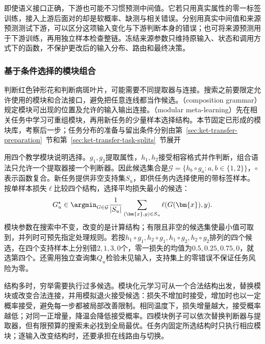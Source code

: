 即使语义接口正确，下游也可能不习惯预测中间值。它若只用真实属性的零一标签训练，接入上游后面对的却是软概率、缺测与相关错误。分别用真实中间值和来源预测测试下游，可以区分这项输入变化与下游判断本身的错误；也可将来源预测用于下游训练，再用独立样本检查整链。冻结来源参数只维持原输入、状态和调用方式下的函数，不保护更改后的输入分布、路由和最终决策。

\subsubsection{基于条件选择的模块组合}
\label{sec:ket-integration-conditional-modules}

判断红色钟形花和判断病斑叶片，可能需要不同提取器与连接。搜索之前要限定允许使用的模块和合法接口，避免把任意连线都当作候选。（composition grammar）规定模块可出现的位置及允许的输入输出连接。（modular meta-learning）先在相关任务中学习可重组模块，再用新任务的少量样本选择结构。本节固定已形成的模块库，考察后一步；任务分布的准备与留出条件分别由第~\ref{sec:ket-transfer-preparation}~节和第~\ref{sec:ket-transfer-task-splits}~节展开

用四个教学模块说明选择。$g_1,g_2$提取属性，$h_1,h_2$接受相容格式并作判断，组合语法只允许一个提取器接一个判断器。因此候选集合是$\mathcal{G}=\{h_b\circ g_a:a,b\in\{1,2\}\}$，$\circ$表示函数复合。新任务提供非空支持集$S_u$，即供任务内选择使用的带标签样本。按单样本损失$\ell$比较四个结构，选择平均损失最小的候选：
\begin{equation}
  G_u^\star\in\argmin_{G\in\mathcal{G}}
  \frac{1}{|S_u|}\sum_{(\bm{x},y)\in S_u}\ell(G(\bm{x}),y).
  \label{eq:ket-integration-structure-search}
\end{equation}
模块参数在搜索中不变，改变的是计算结构；有限且非空的候选集使最小值可取到，并列时可预先指定处理规则。若按$h_1\circ g_1,h_2\circ g_1,h_1\circ g_2,h_2\circ g_2$排列的四个候选，在四个支持样本上分别错$2,1,3,0$个，零一损失的均值为$0.5,0.25,0.75,0$，就选第四个。还需用独立查询集$Q_u$检验未见输入，支持集上的零错误不保证任务风险为零。

结构多时，穷举需要执行过多候选。模块化元学习可从一个合法结构出发，替换模块或改变合法连接，并用模拟退火接受候选：损失不增加时接受，增加时也以一定概率接受，避免每一步都被局部改善限制。相同温度下，损失增量越大，接受概率越低；对同一正增量，降温会降低接受概率。四模块例子可以依次替换判断器与提取器，但有限预算的搜索未必找到全局最优。任务内固定所选结构时只执行相应模块；逐输入改变结构时，还要承担在线路由与切换。

